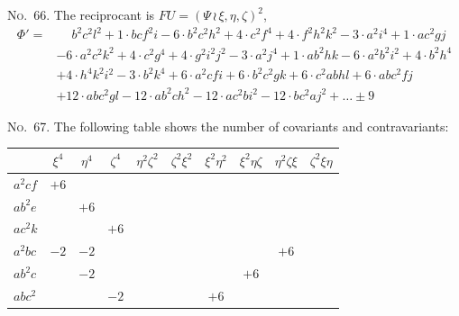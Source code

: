 \documentclass[11pt,a4paper]{book}
\begin{document}
\begin{center}
\noindent\textsc{No.~66.} The reciprocant is $FU = (\Psi\, \wr\, \xi, \eta, \zeta)^2$,
\begin{align*}
\Phi' = &\phantom{+} b^2c^2l^2 + 1\cdot bcf^2i - 6\cdot b^2c^2h^2 + 4\cdot c^2f^4 + 4\cdot f^2h^2k^2 - 3\cdot a^2i^4 + 1\cdot ac^2gj\\
& - 6\cdot a^2c^2k^2 + 4\cdot c^2g^4 + 4\cdot g^2i^2j^2 - 3\cdot a^2j^4 + 1\cdot ab^2hk - 6\cdot a^2b^2i^2 + 4\cdot b^2h^4\\
& + 4\cdot h^4k^2i^2 - 3\cdot b^2k^4 + 6\cdot a^2cfi + 6\cdot b^2c^2gk + 6\cdot c^2abhl + 6\cdot abc^2fj\\
& + 12\cdot abc^2gl - 12\cdot ab^2ch^2 - 12\cdot ac^2bi^2 - 12\cdot bc^2aj^2 + \ldots \pm 9
\end{align*}

\clearpage
\noindent\textsc{No.~67.} The following table shows the number of covariants and contravariants:
\begin{center}
\begin{tabular}{lccccccccc}
\toprule
& $\xi^4$ & $\eta^4$ & $\zeta^4$ & $\eta^2\zeta^2$ & $\zeta^2\xi^2$ & $\xi^2\eta^2$ & $\xi^2\eta\zeta$ & $\eta^2\zeta\xi$ & $\zeta^2\xi\eta$ \\
\midrule
$a^2cf$ & $+6$ & & & & & & & & \\
$ab^2e$ & & $+6$ & & & & & & & \\
$ac^2k$ & & & $+6$ & & & & & & \\
$a^2bc$ & $-2$ & $-2$ & & & & & & $+6$ & \\
$ab^2c$ & & $-2$ & & & & & $+6$ & & \\
$abc^2$ & & & $-2$ & & & $+6$ & & & \\
\bottomrule
\end{tabular}
\end{center}


\end{center}
\end{document}
